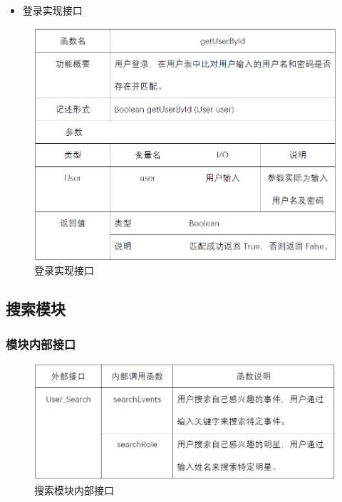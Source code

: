 \begin{itemize} 
	\item 登录实现接口
\end{itemize}
\begin{figure}[!htbp]
	\centering
	\includegraphics[scale=0.75]{image/b3.png} %
	\caption{登录实现接口} %
\end{figure}
\subsection{搜索模块}
\subsubsection{模块内部接口}
\begin{figure}[!htbp]
	\centering
	\includegraphics[scale=0.75]{image/b4.png} %
	\caption{搜索模块内部接口} %
\end{figure}
